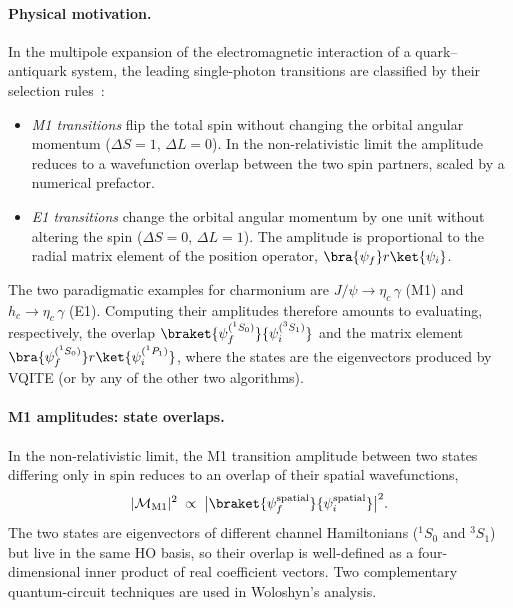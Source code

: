 \paragraph{Physical motivation.}
In the multipole expansion of the electromagnetic interaction of a
quark--antiquark system, the leading single-photon transitions are
classified by their selection rules~\cite{brambilla2011}:
\begin{itemize}\setlength{\itemsep}{2pt}
  \item \emph{M1 transitions} flip the total spin without changing the
    orbital angular momentum ($\Delta S = 1$, $\Delta L = 0$). In the
    non-relativistic limit the amplitude reduces to a wavefunction
    overlap between the two spin partners, scaled by a numerical
    prefactor.
  \item \emph{E1 transitions} change the orbital angular momentum by one
    unit without altering the spin ($\Delta S = 0$, $\Delta L = 1$). The
    amplitude is proportional to the radial matrix element of the
    position operator, $\bra{\psi_f}r\ket{\psi_i}$.
\end{itemize}
The two paradigmatic examples for charmonium are
$J/\psi \to \eta_c\,\gamma$ (M1) and $h_c \to \eta_c\,\gamma$ (E1).
Computing their amplitudes therefore amounts to evaluating, respectively,
the overlap $\braket{\psi_f^{({}^1S_0)}}{\psi_i^{({}^3S_1)}}$ and the
matrix element $\bra{\psi_f^{({}^1S_0)}}r\ket{\psi_i^{({}^1P_1)}}$, where
the states are the eigenvectors produced by VQITE (or by any of the
other two algorithms).

\paragraph{M1 amplitudes: state overlaps.}
In the non-relativistic limit, the M1 transition amplitude between two
states differing only in spin reduces to an overlap of their spatial
wavefunctions,
\begin{equation}
  \label{eq:m1_amplitude}
  |\mathcal{M}_{\mathrm{M1}}|^{2} \;\propto\;
  \bigl|\braket{\psi_f^{\mathrm{spatial}}}{\psi_i^{\mathrm{spatial}}}\bigr|^{2}.
\end{equation}
The two states are eigenvectors of different channel Hamiltonians
(${}^1S_0$ and ${}^3S_1$) but live in the same HO basis, so their
overlap is well-defined as a four-dimensional inner product of real
coefficient vectors. Two complementary quantum-circuit techniques are
used in Woloshyn's analysis.


